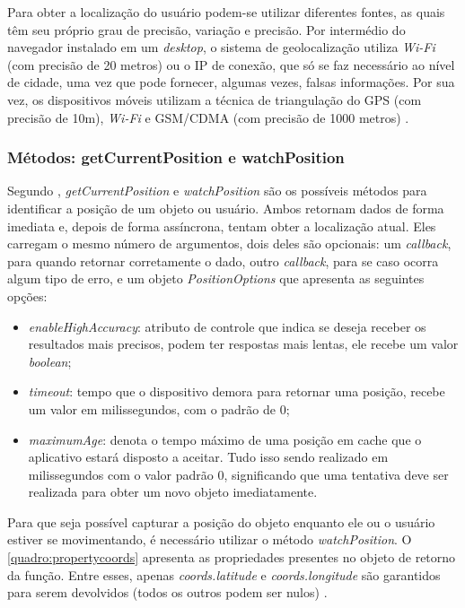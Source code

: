 Para obter a localização do usuário podem-se utilizar diferentes fontes, as quais têm seu próprio grau de precisão, variação e precisão. Por intermédio do navegador instalado em um \textit{desktop}, o sistema de geolocalização utiliza \textit{Wi-Fi} (com precisão de 20 metros) ou o IP de conexão, que só se faz necessário ao nível de cidade,  uma vez que pode fornecer, algumas vezes, falsas informações. Por sua vez, os dispositivos móveis utilizam a técnica de triangulação do GPS (com precisão de 10m), \textit{Wi-Fi} e GSM/CDMA (com precisão de 1000 metros) \cite{geolocalizacao:2011}.

\subsubsection{Métodos: getCurrentPosition e watchPosition}

Segundo , \textit{getCurrentPosition} e \textit{watchPosition} são os possíveis métodos para identificar a posição de um objeto ou usuário. Ambos retornam dados de forma imediata e, depois de forma assíncrona, tentam obter a localização atual. Eles carregam o mesmo número de argumentos, dois deles são opcionais: um \textit{callback}, para quando retornar corretamente o dado, outro \textit{callback}, para se caso ocorra algum tipo de erro, e um objeto \textit{PositionOptions} que apresenta as seguintes opções:

\newpage
\begin{itemize}
    \item \textit{enableHighAccuracy}: atributo de controle que indica se deseja receber os resultados mais precisos, podem ter respostas mais lentas, ele recebe um valor \textit{boolean};
    \item \textit{timeout}: tempo que o dispositivo demora para retornar uma posição, recebe um valor em milissegundos, com o padrão de 0;
    \item \textit{maximumAge}: denota o tempo máximo de uma posição em cache que o aplicativo estará disposto a aceitar. Tudo isso sendo realizado em milissegundos com o valor padrão 0, significando que uma tentativa deve ser realizada para obter um novo objeto imediatamente.
\end{itemize}

Para que seja possível capturar a posição do objeto enquanto ele ou o usuário estiver se movimentando, é necessário utilizar o método \textit{watchPosition}. O \autoref{quadro:propertycoords} apresenta as propriedades presentes no objeto de retorno da função. Entre esses, apenas \textit{coords.latitude} e \textit{coords.longitude} são garantidos para serem devolvidos (todos os outros podem ser nulos) \cite{geolocalizacao:2011}.

